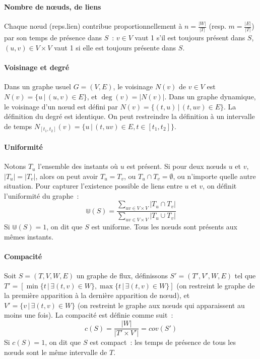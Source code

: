 \documentclass[12pt,a4paper]{article}
\begin{document}
\paragraph{Nombre de nœuds, de liens} Chaque nœud (reps.\@ lien)
contribue proportionnellement à \(n = \frac{|W|}{|T|}\) (resp.\@
\(m = \frac{|E|}{|T|}\)) par son temps de présence dans \(S\)~:
\(v \in V\) vaut 1 s'il est toujours présent dans \(S\),
\((u, v) \in V \times V\) vaut 1 si elle est toujours présente dans
\(S\).

\paragraph{Voisinage et degré} Dans un graphe usuel \(G = (V, E)\), le
voisinage \(N(v)\) de \(v \in V\) est
\(N(v) = \{u \,|\, (u, v) \in E\}\), et \(\deg(v) = |N(v)|\). Dans un
graphe dynamique, le voisinage d'un nœud est défini par
\(N(v) = \{(t, u) \,|\, (t, uv) \in E\}\). La définition du degré est
identique. On peut restreindre la définition à un intervalle de temps
\(N_{[t_1, t_2]}(v) = \{u \,|\, (t, uv) \in E, t \in [t_1, t_2]\}\).\\

\paragraph{Uniformité} Notons \(T_u\) l'ensemble des instants où \(u\)
est présent. Si pour deux nœuds \(u\) et \(v\), \(|T_u| = |T_v|\),
alors on peut avoir \(T_u = T_v\), ou \(T_u \cap T_v = \emptyset\), ou
n'importe quelle autre situation. Pour capturer l'existence possible
de liens entre \(u\) et \(v\), on définit l'uniformité du graphe~:
\[\Cup(S) = \frac{\sum_{uv \in V \times V}|T_u \cap T_v|}{\sum_{uv \in
      V \times V}|T_u \cup T_v|}\]
Si \(\Cup(S) = 1\), on dit que \(S\) est uniforme. Tous les nœuds sont
présents aux mêmes instants.

\paragraph{Compacité} Soit \(S = (T, V, W, E)\) un graphe de flux,
définissons \(S' = (T', V', W, E)\) tel que
\(T' = [\min\{t \,|\, \exists (t, v) \in W\}, \max\{t \,|\, \exists
(t, v) \in W\}]\) (on restreint le graphe de la première apparition à
la dernière apparition de nœud), et
\(V' = \{v \,|\, \exists (t, v) \in W\}\) (on restreint le graphe aux
nœuds qui apparaissent au moins une fois). La compacité est définie
comme suit~:
\[c(S) = \frac{|W|}{|T' \times V'|} = cov(S')\]
Si \(c(S) = 1\), on dit que \(S\) est compact~: les temps de présence
de tous les nœuds sont le même intervalle de \(T\).\\
\end{document}
